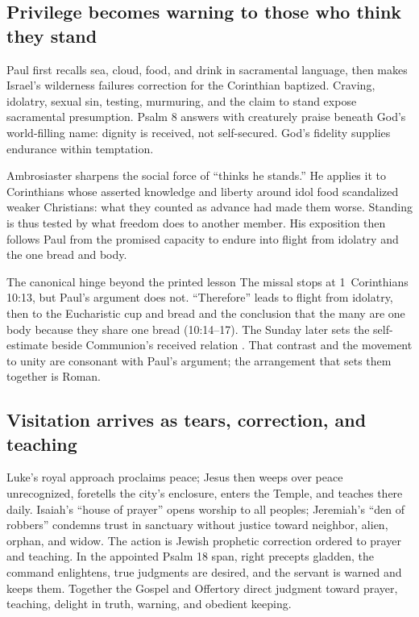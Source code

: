 {\subsection*{Privilege becomes warning to those who think they stand\enspace{}}

Paul first recalls sea, cloud, food, and drink in sacramental language, then makes Israel's wilderness failures correction for the Corinthian baptized. Craving, idolatry, sexual sin, testing, murmuring, and the claim to stand expose sacramental presumption. Psalm 8 answers with creaturely praise beneath God's world-filling name: dignity is received, not self-secured. God's fidelity supplies endurance within temptation.

Ambrosiaster sharpens the social force of ``thinks he stands.'' He applies it to Corinthians whose asserted knowledge and liberty around idol food scandalized weaker Christians: what they counted as advance had made them worse. Standing is thus tested by what freedom does to another member. His exposition then follows Paul from the promised capacity to endure into flight from idolatry and the one bread and body.

\begin{studybox}{The canonical hinge beyond the printed lesson}
The missal stops at 1~Corinthians 10:13, but Paul's argument does not. ``Therefore'' leads to flight from idolatry, then to the Eucharistic cup and bread and the conclusion that the many are one body because they share one bread (10:14--17). The Sunday later sets the self-estimate  beside Communion's received relation . That contrast and the movement to unity are consonant with Paul's argument; the arrangement that sets them together is Roman.
\end{studybox}

\newpage

\subsection*{Visitation arrives as tears, correction, and teaching\enspace{}}

Luke's royal approach proclaims peace; Jesus then weeps over peace unrecognized, foretells the city's enclosure, enters the Temple, and teaches there daily. Isaiah's ``house of prayer'' opens worship to all peoples; Jeremiah's ``den of robbers'' condemns trust in sanctuary without justice toward neighbor, alien, orphan, and widow. The action is Jewish prophetic correction ordered to prayer and teaching. In the appointed Psalm 18 span, right precepts gladden, the command enlightens, true judgments are desired, and the servant is warned and keeps them. Together the Gospel and Offertory direct judgment toward prayer, teaching, delight in truth, warning, and obedient keeping.

}
